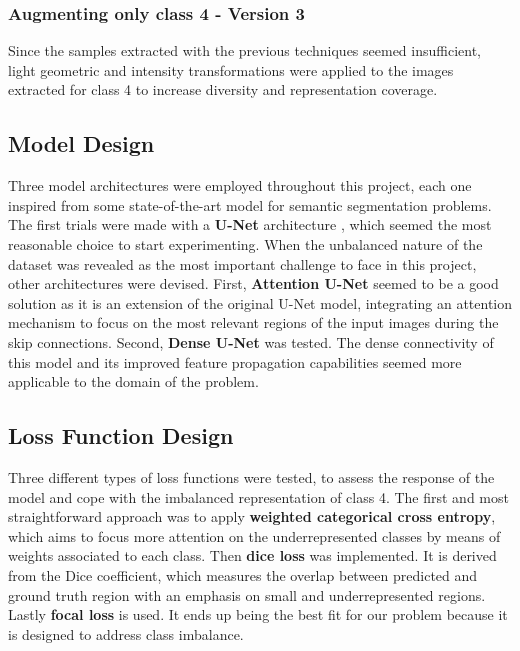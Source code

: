\documentclass[11pt]{article}
\begin{document}
\begin{multicols}{2}
        \subsubsection{Augmenting only class 4 - Version 3}
        \label{sec:augv3}
         Since the samples extracted with the previous techniques seemed insufficient, light geometric and intensity transformations were applied to the images extracted for class 4 to increase diversity and representation coverage.

        \subsection{Model Design}

        Three model architectures were employed throughout this project, each one inspired from some state-of-the-art model for semantic segmentation problems. The first trials were made with a \textbf{U-Net} architecture \cite{ronneberger2015u}, which seemed the most reasonable choice to start experimenting. When the unbalanced nature of the dataset was revealed as the most important challenge to face in this project, other architectures were devised. First, \textbf{Attention U-Net} \cite{oktay2018attention} seemed to be a good solution as it is an extension of the original U-Net model, integrating an attention mechanism to focus on the most relevant regions of the input images during the skip connections. Second, \textbf{Dense U-Net} \cite{cai2020dense} was tested. The dense connectivity of this model and its improved feature propagation capabilities seemed more applicable to the domain of the problem.

        \subsection{Loss Function Design}
        Three different types of loss functions were tested, to assess the response of the model and cope with the imbalanced representation of class 4. The first and most straightforward approach was to apply \textbf{weighted categorical cross entropy}, which aims to focus more attention on the underrepresented classes by means of weights associated to each class. Then \textbf{dice loss}\cite{li2019dice} was implemented. It is derived from the Dice coefficient, which measures the overlap between predicted and ground truth region with an emphasis on small and underrepresented regions. Lastly \textbf{focal loss}\cite{ross2017focal} is used. It ends up being the best fit for our problem because it is designed to address class imbalance.


\end{multicols}
\end{document}
